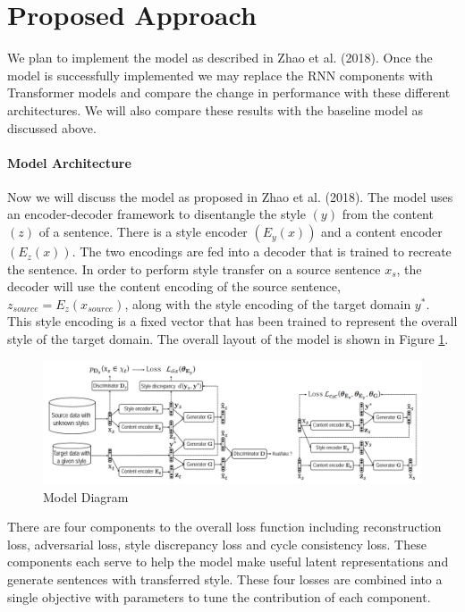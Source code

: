 \documentclass{article}
\begin{document}
\section{Proposed Approach}
\label{approach}
We plan to implement the model as described in Zhao et al. (2018). Once the model is successfully implemented we may replace the RNN components with Transformer models and compare the change in performance with these different architectures. We will also compare these results with the baseline model as discussed above. \newline

\paragraph{Model Architecture}
Now we will discuss the model as proposed in Zhao et al. (2018). The model uses an encoder-decoder framework to disentangle the style $(y)$  from the content$(z)$ of a sentence. There is a style encoder $(E_y (x))$ and a content encoder $(E_z (x))$. The two encodings are fed into a decoder that is trained to recreate the sentence. In order to perform style transfer on a source sentence $x_s$, the decoder will use the content encoding of the source sentence, $z_{source} = E_z (x_{source})$, along with the style encoding of the target domain $ y^*$. This style encoding is a fixed vector that has been trained to represent the overall style of the target domain. The overall layout of the model is shown in Figure \ref{fig:model}.

\begin{figure}[h!]
  \includegraphics[scale=0.55]{model.PNG}
  \caption{Model Diagram}
  \label{fig:model}
\end{figure}

There are four components to the overall loss function including reconstruction loss, adversarial loss, style discrepancy loss and cycle consistency loss. These components each serve to help the model make useful latent representations and generate sentences with transferred style. These four losses are combined into a single objective with parameters to tune the contribution of each component.
\end{document}

